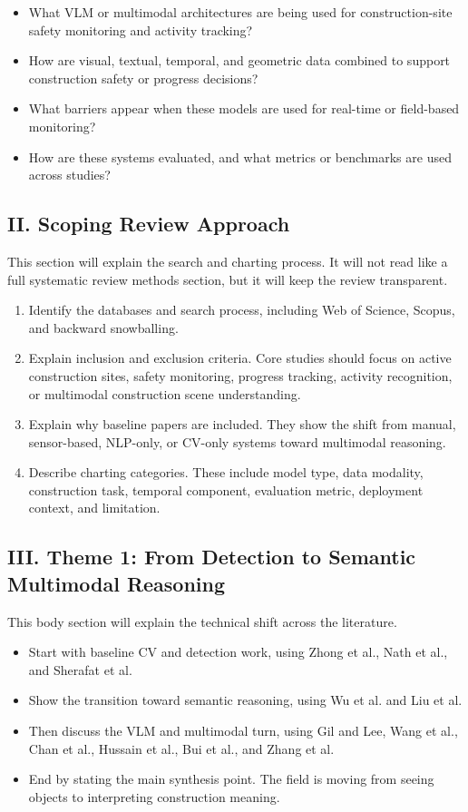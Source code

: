 \documentclass[10pt, letterpaper]{article}
\begin{document}
\begin{itemize}
\item What VLM or multimodal architectures are being used for construction-site safety monitoring and activity tracking?
\item How are visual, textual, temporal, and geometric data combined to support construction safety or progress decisions?
\item What barriers appear when these models are used for real-time or field-based monitoring?
\item How are these systems evaluated, and what metrics or benchmarks are used across studies?
\end{itemize}

\subsection{II. Scoping Review Approach}

This section will explain the search and charting process. It will not read like a full systematic review methods section, but it will keep the review transparent.

\begin{enumerate}
\item Identify the databases and search process, including Web of Science, Scopus, and backward snowballing.
\item Explain inclusion and exclusion criteria. Core studies should focus on active construction sites, safety monitoring, progress tracking, activity recognition, or multimodal construction scene understanding.
\item Explain why baseline papers are included. They show the shift from manual, sensor-based, NLP-only, or CV-only systems toward multimodal reasoning.
\item Describe charting categories. These include model type, data modality, construction task, temporal component, evaluation metric, deployment context, and limitation.
\end{enumerate}

\subsection{III. Theme 1: From Detection to Semantic Multimodal Reasoning}

This body section will explain the technical shift across the literature.

\begin{itemize}
\item Start with baseline CV and detection work, using Zhong et al., Nath et al., and Sherafat et al.
\item Show the transition toward semantic reasoning, using Wu et al. and Liu et al.
\item Then discuss the VLM and multimodal turn, using Gil and Lee, Wang et al., Chan et al., Hussain et al., Bui et al., and Zhang et al.
\item End by stating the main synthesis point. The field is moving from seeing objects to interpreting construction meaning.
\end{itemize}
\end{document}
